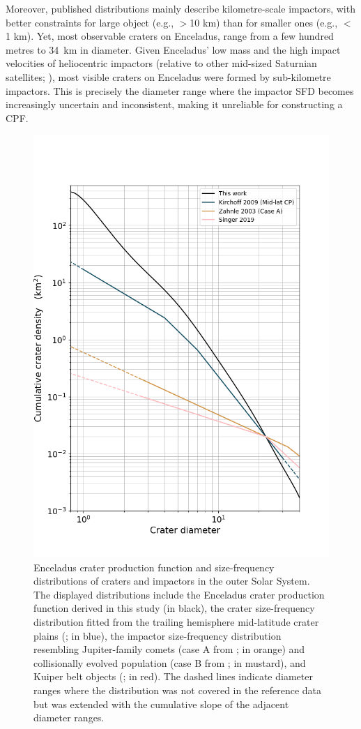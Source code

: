 \documentclass[preprint,11pt,3p,times,authoryear]{elsarticle}
\begin{document}
Moreover, published distributions mainly describe kilometre-scale impactors, with better constraints for large object (e.g., $>$10 km) than for smaller ones (e.g., $<$1 km). Yet, most observable craters on Enceladus, range from a few hundred metres to 34~km in diameter. Given Enceladus’ low mass and the high impact velocities of heliocentric impactors (relative to other mid-sized Saturnian satellites; \citealt{Zahnle2003, Wong2021}), most visible craters on Enceladus were formed by sub-kilometre impactors. This is precisely the diameter range where the impactor SFD becomes increasingly uncertain and inconsistent, making it unreliable for constructing a CPF. \\

\begin{figure}[H]
    \centering
    \includegraphics[width=0.6\linewidth]{fig/compare_enc_terrains_degpoly_FigS3.png}
    \caption{Enceladus crater production function and size-frequency distributions of craters and impactors in the outer Solar System. The displayed distributions include the Enceladus crater production function derived in this study (in black), the crater size-frequency distribution fitted from the trailing hemisphere mid-latitude crater plains (\citet{Kirchoff2009}; in blue), the impactor size-frequency distribution resembling Jupiter-family comets (case A from \citet{Zahnle2003}; in orange) and collisionally evolved population (case B from \citet{Zahnle2003}; in mustard), and Kuiper belt objects (\citet{Singer2019}; in red). The dashed lines indicate diameter ranges where the distribution was not covered in the reference data but was extended with the cumulative slope of the adjacent diameter ranges.}
    \label{fig:cpf_compare}
\end{figure}
\end{document}

